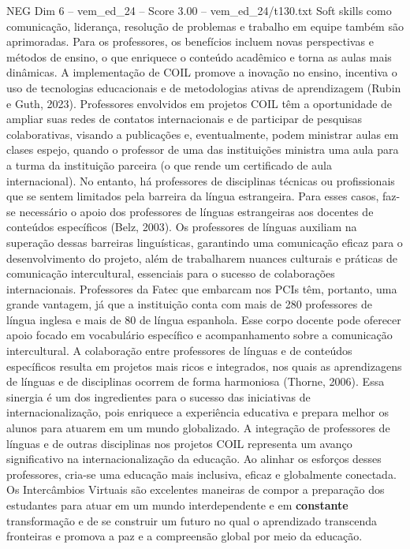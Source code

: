 \begin{textsample}{NEG Dim 6 – vem\_ed\_24 – Score 3.00 – vem\_ed\_24/t130.txt}
Soft skills como comunicação, liderança, resolução de problemas e trabalho em equipe também são aprimoradas.
Para os professores, os benefícios incluem novas perspectivas e métodos de ensino, o que enriquece o conteúdo acadêmico e torna as aulas mais dinâmicas.
A implementação de COIL promove a inovação no ensino, incentiva o uso de tecnologias educacionais e de metodologias ativas de aprendizagem (Rubin e Guth, 2023).
Professores envolvidos em projetos COIL têm a oportunidade de ampliar suas redes de contatos internacionais e de participar de pesquisas colaborativas, visando a publicações e, eventualmente, podem ministrar aulas em clases espejo, quando o professor de uma das instituições ministra uma aula para a turma da instituição parceira (o que rende um certificado de aula internacional).
No entanto, há professores de disciplinas técnicas ou profissionais que se sentem limitados pela barreira da língua estrangeira.
Para esses casos, faz-se necessário o apoio dos professores de línguas estrangeiras aos docentes de conteúdos específicos (Belz, 2003).
Os professores de línguas auxiliam na superação dessas barreiras linguísticas, garantindo uma comunicação eficaz para o desenvolvimento do projeto, além de trabalharem nuances culturais e práticas de comunicação intercultural, essenciais para o sucesso de colaborações internacionais.
Professores da Fatec que embarcam nos PCIs têm, portanto, uma grande vantagem, já que a instituição conta com mais de 280 professores de língua inglesa e mais de 80 de língua espanhola.
Esse corpo docente pode oferecer apoio focado em vocabulário específico e acompanhamento sobre a comunicação intercultural.
A colaboração entre professores de línguas e de conteúdos específicos resulta em projetos mais ricos e integrados, nos quais as aprendizagens de línguas e de disciplinas ocorrem de forma harmoniosa (Thorne, 2006).
Essa sinergia é um dos ingredientes para o sucesso das iniciativas de internacionalização, pois enriquece a experiência educativa e prepara melhor os alunos para atuarem em um mundo globalizado.
A integração de professores de línguas e de outras disciplinas nos projetos COIL representa um avanço significativo na internacionalização da educação.
Ao alinhar os esforços desses professores, cria-se uma educação mais inclusiva, eficaz e globalmente conectada.
Os Intercâmbios Virtuais são excelentes maneiras de compor a preparação dos estudantes para atuar em um mundo interdependente e em \textbf{constante} transformação e de se construir um futuro no qual o aprendizado transcenda fronteiras e promova a paz e a compreensão global por meio da educação.

\end{textsample}
